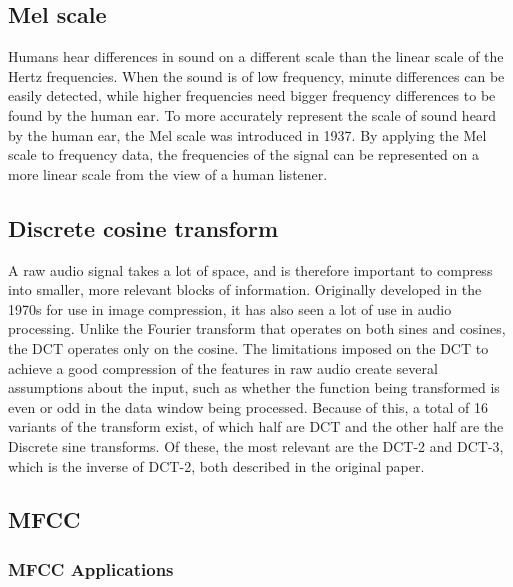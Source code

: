 \subsection{Mel scale}
Humans hear differences in sound on a different scale than the linear scale of the Hertz frequencies.
When the sound is of low frequency, minute differences can be easily detected, while higher frequencies need bigger frequency differences to be found by the human ear.
To more accurately represent the scale of sound heard by the human ear, the Mel scale was introduced in 1937\cite{melpaper}.
By applying the Mel scale to frequency data, the frequencies of the signal can be represented on a more linear scale from the view of a human listener.

\subsection{Discrete cosine transform}
A raw audio signal takes a lot of space, and is therefore important to compress into smaller, more relevant blocks of information.
Originally developed in the 1970s\cite{dctpaper} for use in image compression, it has also seen a lot of use in audio processing.
Unlike the Fourier transform that operates on both sines and cosines, the DCT operates only on the cosine.
The limitations imposed on the DCT to achieve a good compression of the features in raw audio create several assumptions about the input, such as whether the function being transformed is even or odd in the data window being processed.
Because of this, a total of 16 variants of the transform exist, of which half are DCT and the other half are the Discrete sine transforms.
Of these, the most relevant are the DCT-2 and DCT-3, which is the inverse of DCT-2, both described in the original paper\cite{dctpaper}.

\subsection{MFCC}




\subsubsection{MFCC Applications}


